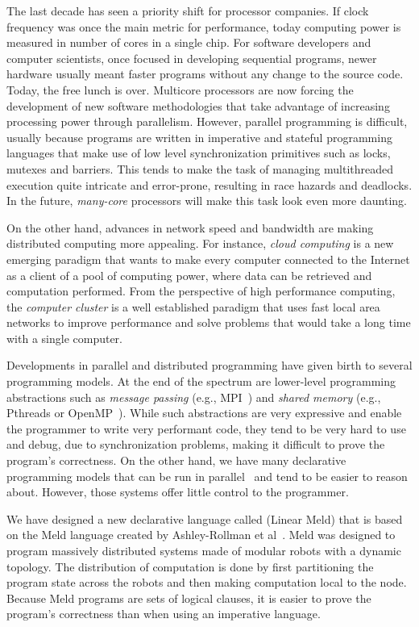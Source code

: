 
The last decade has seen a priority shift for processor companies. If clock frequency
was once the main metric for performance, today computing power is measured in number of
cores in a single chip.
For software developers and computer scientists, once focused in developing sequential programs,
newer hardware usually meant faster programs without any change to the source code. Today,
the free lunch is over. Multicore processors are now forcing the development of
new software methodologies that take advantage of increasing processing power through parallelism.
However, parallel programming is difficult, usually because programs are written
in imperative and stateful programming languages that make use of low level synchronization
primitives such as locks, mutexes and barriers. This tends to make the task of managing multithreaded
execution quite intricate and error-prone, resulting in race hazards and deadlocks.
In the future, \emph{many-core} processors will make this task look even more daunting.

On the other hand, advances in network speed and bandwidth are making distributed computing
more appealing. For instance, \emph{cloud computing} is a new emerging paradigm that wants
to make every computer connected to the Internet as a client of a pool of computing power,
where data can be retrieved and computation performed. From the perspective of high performance
computing, the \emph{computer cluster} is a well established paradigm that uses fast local area
networks to improve performance and solve problems that would take a long time with a single computer.

Developments in parallel and distributed programming have given birth to several programming models.
At the end of the spectrum are lower-level programming abstractions such as
\emph{message passing} (e.g., MPI~\cite{gabriel04-open-mpi}) and \emph{shared memory}
(e.g., Pthreads or OpenMP~\cite{Chapman-2007-UOP-1370966}).
While such abstractions are very expressive and enable the programmer to write very performant code,
they tend to be very hard to use and debug, due to synchronization problems, making it difficult to
prove the program's correctness. On the other hand, we have many declarative programming models
that can be run in parallel~\cite{Blelloch:1996:PPA:227234.227246} and tend to be easier to reason about.
However, those systems offer little control to the programmer.

We have designed a new declarative language called \lang (Linear Meld) that is based on the Meld language
created by Ashley-Rollman et al~\cite{ashley-rollman-iclp09, ashley-rollman-derosa-iros07wksp}. Meld
was designed to program massively distributed systems made of modular robots with a dynamic topology.
The distribution of computation is done by first partitioning the program state across the robots
and then making computation local to the node. Because Meld programs are sets of logical clauses, it
is easier to prove the program's correctness than when using an imperative language.

